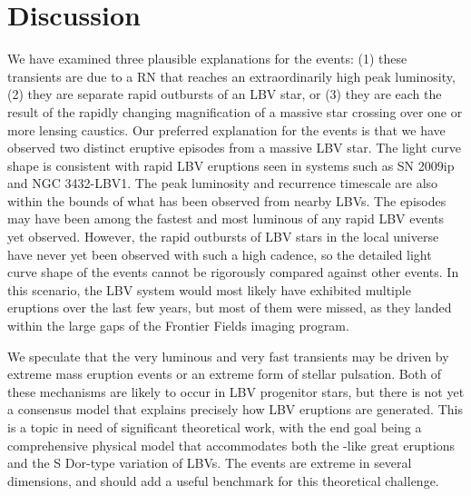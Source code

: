 \section{Discussion}\label{sec:Discussion}

We have examined three plausible explanations for the
\spock events: (1) these transients are due to a RN that reaches an
extraordinarily high peak luminosity, (2) they are separate rapid
outbursts of an LBV star, or (3) they are each the result of the
rapidly changing magnification of a massive star crossing over one or
more lensing caustics.  Our preferred explanation for the \spock
events is that we have observed two distinct eruptive episodes from a
massive LBV star.  The light curve shape is consistent with rapid LBV
eruptions seen in systems such as SN 2009ip and NGC 3432-LBV1.  The
peak luminosity and recurrence timescale are also within the bounds of
what has been observed from nearby LBVs.  The \spock episodes may have
been among the fastest and most luminous of any rapid LBV events yet
observed. However, the rapid outbursts of LBV stars in the local
universe have never yet been observed with such a high cadence, so the
detailed light curve shape of the \spock events cannot be rigorously
compared against other events.  In this scenario, the \spock LBV
system would most likely have exhibited multiple eruptions over the
last few years, but most of them were missed, as they landed within
the large gaps of the \HST Frontier Fields imaging program.

We speculate that the very luminous and very fast \spock transients
may be driven by extreme mass eruption events or an extreme form of
stellar pulsation.  Both of these mechanisms are likely to occur in
LBV progenitor stars, but there is not yet a consensus model that
explains precisely how LBV eruptions are generated. This is a topic in
need of significant theoretical work, with the end goal being a
comprehensive physical model that accommodates both the \etacar-like
great eruptions and the S Dor-type variation of LBVs.  The \spock
events are extreme in several dimensions, and should add a useful
benchmark for this theoretical challenge.

